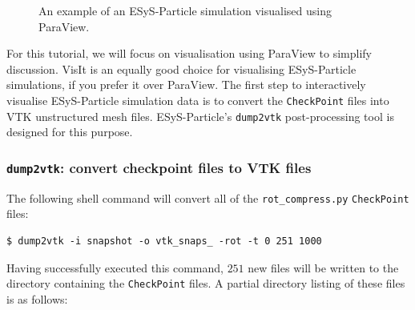 \begin{figure}
\caption{An example of an ESyS-Particle simulation visualised using ParaView.} 
\label{fig:PV_initial_window}
\end{figure}


For this tutorial, we will focus on visualisation using ParaView to simplify discussion. VisIt is an equally good choice for visualising ESyS-Particle simulations, if you prefer it over ParaView.  The first step to interactively visualise ESyS-Particle simulation data is to convert the \texttt{CheckPoint} files into VTK unstructured mesh files. ESyS-Particle's \texttt{dump2vtk} post-processing tool is designed for this purpose.

\subsubsection{\texttt{dump2vtk}: convert checkpoint files to VTK files}

The following shell command will convert all of the \texttt{rot\_compress.py} \texttt{CheckPoint} files:

\begin{verbatim}
$ dump2vtk -i snapshot -o vtk_snaps_ -rot -t 0 251 1000
\end{verbatim}

\noindent
Having successfully executed this command, $251$ new files will be written to the directory containing the \texttt{CheckPoint} files. A partial directory listing of these files is as follows:

